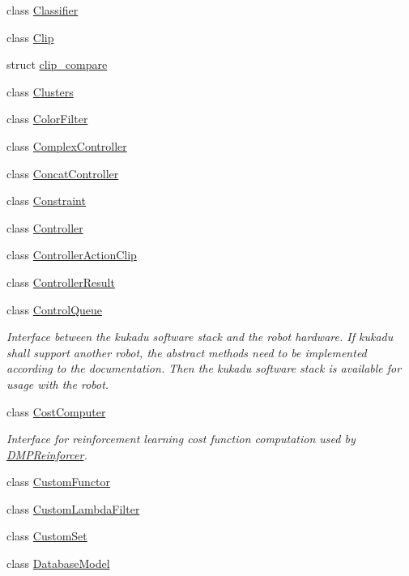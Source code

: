 \begin{DoxyCompactItemize}
class \hyperlink{classkukadu_1_1Classifier}{Classifier}
\item 
class \hyperlink{classkukadu_1_1Clip}{Clip}
\item 
struct \hyperlink{structkukadu_1_1clip__compare}{clip\+\_\+compare}
\item 
class \hyperlink{classkukadu_1_1Clusters}{Clusters}
\item 
class \hyperlink{classkukadu_1_1ColorFilter}{Color\+Filter}
\item 
class \hyperlink{classkukadu_1_1ComplexController}{Complex\+Controller}
\item 
class \hyperlink{classkukadu_1_1ConcatController}{Concat\+Controller}
\item 
class \hyperlink{classkukadu_1_1Constraint}{Constraint}
\item 
class \hyperlink{classkukadu_1_1Controller}{Controller}
\item 
class \hyperlink{classkukadu_1_1ControllerActionClip}{Controller\+Action\+Clip}
\item 
class \hyperlink{classkukadu_1_1ControllerResult}{Controller\+Result}
\item 
class \hyperlink{classkukadu_1_1ControlQueue}{Control\+Queue}
\begin{DoxyCompactList}\small\item\em Interface between the kukadu software stack and the robot hardware. If kukadu shall support another robot, the abstract methods need to be implemented according to the documentation. Then the kukadu software stack is available for usage with the robot. \end{DoxyCompactList}\item 
class \hyperlink{classkukadu_1_1CostComputer}{Cost\+Computer}
\begin{DoxyCompactList}\small\item\em Interface for reinforcement learning cost function computation used by \hyperlink{classkukadu_1_1DMPReinforcer}{D\+M\+P\+Reinforcer}. \end{DoxyCompactList}\item 
class \hyperlink{classkukadu_1_1CustomFunctor}{Custom\+Functor}
\item 
class \hyperlink{classkukadu_1_1CustomLambdaFilter}{Custom\+Lambda\+Filter}
\item 
class \hyperlink{classkukadu_1_1CustomSet}{Custom\+Set}
\item 
class \hyperlink{classkukadu_1_1DatabaseModel}{Database\+Model}
\item 

\end{DoxyCompactItemize}
